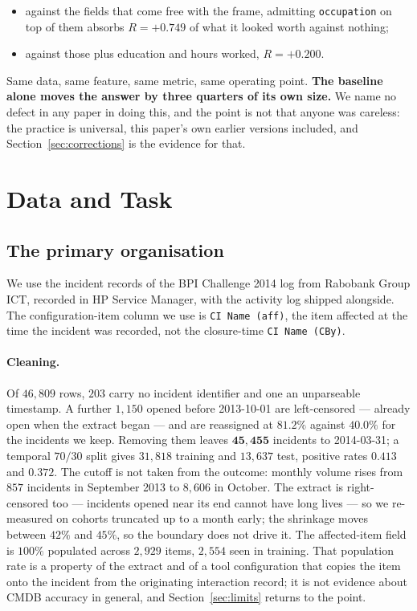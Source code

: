 \documentclass[preprint,12pt]{elsarticle}
\begin{document}
\begin{itemize}
\item against the fields that come free with the frame, admitting
\texttt{occupation} on top of them absorbs $R = +0.749$ of what it looked
worth against nothing;
\item against those plus education and hours worked, $R = +0.200$.
\end{itemize}

Same data, same feature, same metric, same operating point. \textbf{The
baseline alone moves the answer by three quarters of its own size.} We name no
defect in any paper in doing this, and the point is not that anyone was
careless: the practice is universal, this paper's own earlier versions
included, and Section~\ref{sec:corrections} is the evidence for that.

\section{Data and Task}
\label{sec:data}

\subsection{The primary organisation}

We use the incident records of the BPI Challenge 2014 log
\citep{vandongen2014bpic} from Rabobank Group ICT, recorded in HP Service
Manager, with the activity log shipped alongside. The configuration-item
column we use is \texttt{CI Name (aff)}, the item affected at the time the
incident was recorded, not the closure-time \texttt{CI Name (CBy)}.

\paragraph{Cleaning.}
Of $46{,}809$ rows, $203$ carry no incident identifier and one an unparseable
timestamp. A further $1{,}150$ opened before 2013-10-01 are left-censored ---
already open when the extract began --- and are reassigned at $81.2\%$
against $40.0\%$ for the incidents we keep. Removing them leaves
$\mathbf{45{,}455}$ incidents to 2014-03-31; a temporal $70/30$ split gives
$31{,}818$ training and $13{,}637$ test, positive rates $0.413$ and $0.372$.
The cutoff is not taken from the outcome: monthly volume rises from $857$
incidents in September 2013 to $8{,}606$ in October. The extract is
right-censored too --- incidents opened near its end cannot have long lives
--- so we re-measured on cohorts truncated up to a month early; the shrinkage
moves between $42\%$ and $45\%$, so the boundary does not drive it. The
affected-item field is $100\%$ populated across $2{,}929$ items, $2{,}554$
seen in training. That population rate is a property of the extract and of a
tool configuration that copies the item onto the incident from the
originating interaction record; it is not evidence about CMDB accuracy in
general, and Section~\ref{sec:limits} returns to the point.
\end{document}

